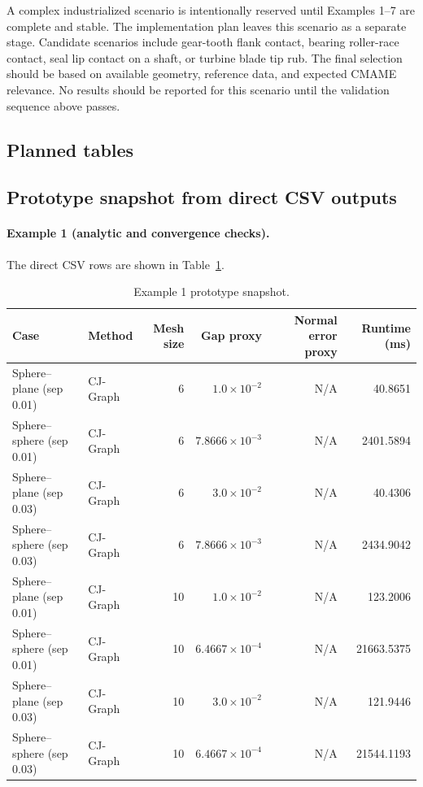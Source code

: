 \documentclass[preprint,12pt]{elsarticle}
\begin{document}
A complex industrialized scenario is intentionally reserved until Examples 1--7 are complete and stable. The implementation plan leaves this scenario as a separate stage. Candidate scenarios include gear-tooth flank contact, bearing roller-race contact, seal lip contact on a shaft, or turbine blade tip rub. The final selection should be based on available geometry, reference data, and expected CMAME relevance. No results should be reported for this scenario until the validation sequence above passes.

\subsection{Planned tables}

\subsection{Prototype snapshot from direct CSV outputs}

\paragraph{Example 1 (analytic and convergence checks).}
The direct CSV rows are shown in Table~\ref{tab:accuracy_snapshot}.

\begin{table}[h]
\centering
\caption{Example 1 prototype snapshot.}
\label{tab:accuracy_snapshot}
\begin{tabular}{l l r r r r}
\toprule
Case & Method & Mesh size & Gap proxy & Normal error proxy & Runtime (ms) \\
\midrule
Sphere--plane (sep 0.01) & CJ-Graph & 6 & $1.0\times 10^{-2}$ & N/A & 40.8651 \\
Sphere--sphere (sep 0.01) & CJ-Graph & 6 & $7.8666\times 10^{-3}$ & N/A & 2401.5894 \\
Sphere--plane (sep 0.03) & CJ-Graph & 6 & $3.0\times 10^{-2}$ & N/A & 40.4306 \\
Sphere--sphere (sep 0.03) & CJ-Graph & 6 & $7.8666\times 10^{-3}$ & N/A & 2434.9042 \\
Sphere--plane (sep 0.01) & CJ-Graph & 10 & $1.0\times 10^{-2}$ & N/A & 123.2006 \\
Sphere--sphere (sep 0.01) & CJ-Graph & 10 & $6.4667\times 10^{-4}$ & N/A & 21663.5375 \\
Sphere--plane (sep 0.03) & CJ-Graph & 10 & $3.0\times 10^{-2}$ & N/A & 121.9446 \\
Sphere--sphere (sep 0.03) & CJ-Graph & 10 & $6.4667\times 10^{-4}$ & N/A & 21544.1193 \\
\bottomrule
\end{tabular}
\end{table}
\end{document}
